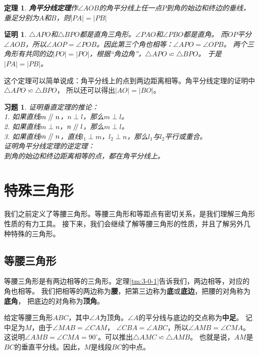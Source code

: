 \documentclass[12pt,UTF8]{ctexbook}
\newtheorem{tm}{定理}[section]
\newtheorem*{proof2}{证明}
\newtheorem{xt}{习题}[section]
\renewcommand\parallel{\mathrel{/\mskip-4mu/}}
\begin{document}
\begin{tm}{\textbf{角平分线定理}}\label{tm:3-1-20}
    作$\angle AOB$的角平分线上任一点$P$到角的始边和终边的垂线，垂足分别为$A$和$B$，则$|PA| = |PB|$
\end{tm}
\begin{proof2}
    $\triangle APO$和$\triangle BPO$都是直角三角形。$\angle PAO$和$\angle PBO$都是直角。
    而$OP$平分$\angle AOB$，所以$\angle AOP = \angle POB$。因此第三个角也相等：$\angle APO = \angle OPB$。
    两个三角形有共同的边$|PO| = |PO|$，根据“角边角”，$\triangle APO \backsimeq \triangle BPO$。
    于是$|PA| = |PB|$。
\end{proof2}
这个定理可以简单说成：角平分线上的点到两边距离相等。角平分线定理的证明中$\triangle APO \backsimeq \triangle BPO$，
所以还可以得出$|AO| = |BO|$。

\begin{xt}
    证明垂直定理的推论：\\
    1. 如果直线$m \parallel n$，$n \perp l$，那么$m \perp l$。\\
    2. 如果直线$m \perp n$，$n \parallel l$，那么$m \perp l$。\\
    3. 如果直线$m \parallel n$，直线$l_1 \perp m$，$l_2 \perp n$，那么$l_1$与$l_2$平行或重合。\\
    证明角平分线定理的逆定理：\\
    到角的始边和终边距离相等的点，都在角平分线上。
\end{xt}

\chapter{特殊三角形}
我们之前定义了等腰三角形。等腰三角形和等距点有密切关系，是我们理解三角形性质的有力工具。
接下来，我们会继续了解等腰三角形的性质，并且了解另外几种特殊的三角形。

\section{等腰三角形}
等腰三角形是有两边相等的三角形。定理\ref{tm:3-0-1}告诉我们，两边相等，对应的角也相等。
我们把相等的两边称为\textbf{腰}，把第三边称为\textbf{底}或\textbf{底边}，把腰的对角称为\textbf{底角}，
把底边的对角称为\textbf{顶角}。

给定等腰三角形$ABC$，其中$\angle A$为顶角。$\angle A$的平分线与底边的交点称为\textbf{中足}。
记中足为$M$，由于$\angle MAB = \angle CAM$，
$\angle CBA = \angle ABC$，所以$\angle AMB = \angle CMA$。
这说明$\angle AMB = \angle CMA = 90^\circ$。可以推出$\triangle AMC \backsimeq \triangle AMB$。
也就是说，$AM$是$BC$的垂直平分线。因此，$M$是线段$BC$的中点。
\end{document}
